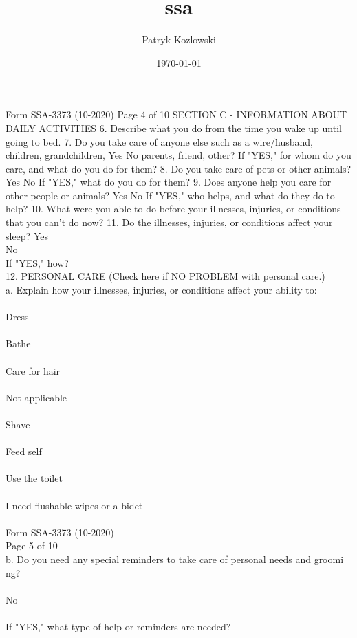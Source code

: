 \documentclass[12pt]{article}
\author{Patryk Kozlowski}
\title{ssa}
\date{\today}
\begin{document}
\maketitle
Form SSA-3373 (10-2020)
Page 4 of 10
SECTION C - INFORMATION ABOUT DAILY ACTIVITIES
6. Describe what you do from the time you wake up until going to bed.
7. Do you take care of anyone else such as a wire/husband, children, grandchildren,
Yes
No
parents, friend, other?
If "YES," for whom do you care, and what do you do for them?
8. Do you take care of pets or other animals?
Yes
No
If "YES," what do you do for them?
9. Does anyone help you care for other people or animals?
Yes
No
If "YES," who helps, and what do they do to help?
10. What were you able to do before your illnesses, injuries, or conditions that you can't do now?
11. Do the illnesses, injuries, or conditions affect your sleep?
Yes\\
No\\
If "YES," how?\\
12. PERSONAL CARE (Check here if NO PROBLEM with personal care.)\\
a. Explain how your illnesses, injuries, or conditions affect your ability to:\\
\\
Dress\\
\\
Bathe\\
\\
Care for hair\\\\
Not applicable\\\\
Shave\\
\\
Feed self\\
\\
Use the toilet\\\\
I need flushable wipes or a bidet\\\\
Form SSA-3373 (10-2020)\\
Page 5 of 10\\
b. Do you need any special reminders to take care of personal needs and groomi\\ng?\\
\\
No\\\\
If "YES," what type of help or reminders are needed?\\\\
\end{document}
